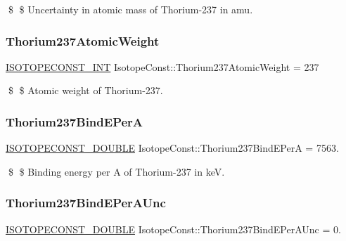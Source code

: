 \$ \$ Uncertainty in atomic mass of Thorium-\/237 in amu. \mbox{\label{group___isotope_const-_thorium-_th237_gaaef1d3b3b532ec40e3a5c68d6508cbda}} 
\subsubsection{\texorpdfstring{Thorium237\+Atomic\+Weight}{Thorium237AtomicWeight}}
{\footnotesize\ttfamily \mbox{\hyperlink{group___isotope_const-_macros_ga5f18360b3e99483a35c32d789e62621c}{I\+S\+O\+T\+O\+P\+E\+C\+O\+N\+S\+T\+\_\+\+I\+NT}} Isotope\+Const\+::\+Thorium237\+Atomic\+Weight = 237}

\$ \$ Atomic weight of Thorium-\/237. \mbox{\label{group___isotope_const-_thorium-_th237_gaf63b6b344b200adcb5aaf6c76a8fd881}} 
\subsubsection{\texorpdfstring{Thorium237\+Bind\+E\+PerA}{Thorium237BindEPerA}}
{\footnotesize\ttfamily \mbox{\hyperlink{group___isotope_const-_macros_ga8f45a7272ce02c0b4c65c44636ed719a}{I\+S\+O\+T\+O\+P\+E\+C\+O\+N\+S\+T\+\_\+\+D\+O\+U\+B\+LE}} Isotope\+Const\+::\+Thorium237\+Bind\+E\+PerA = 7563.}

\$ \$ Binding energy per A of Thorium-\/237 in keV. \mbox{\label{group___isotope_const-_thorium-_th237_gacb2031e9c48bc22b424c719e66287dcc}} 
\subsubsection{\texorpdfstring{Thorium237\+Bind\+E\+Per\+A\+Unc}{Thorium237BindEPerAUnc}}
{\footnotesize\ttfamily \mbox{\hyperlink{group___isotope_const-_macros_ga8f45a7272ce02c0b4c65c44636ed719a}{I\+S\+O\+T\+O\+P\+E\+C\+O\+N\+S\+T\+\_\+\+D\+O\+U\+B\+LE}} Isotope\+Const\+::\+Thorium237\+Bind\+E\+Per\+A\+Unc = 0.}

